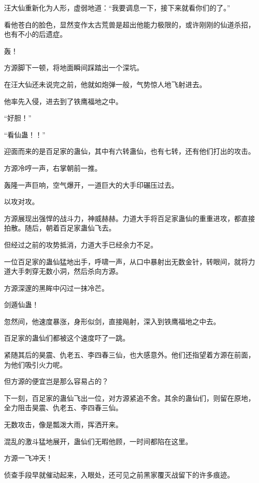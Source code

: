 \begin{this_body}
汪大仙重新化为人形，虚弱地道：“我要调息一下，接下来就看你们的了。”

看他苍白的脸色，显然变作太古荒兽是超出他能力极限的，或许刚刚的仙道杀招，也有不小的后遗症。

轰！

方源脚下一顿，将地面瞬间踩踏出一个深坑。

在汪大仙还未说完之前，他就如炮弹一般，气势惊人地飞射进去。

他率先入侵，进去到了铁鹰福地之中。

“好胆！”

“看仙蛊！！”

迎面而来的是百足家的蛊仙，其中有六转蛊仙，也有七转，还有他们打出的攻击。

方源冷哼一声，右掌朝前一推。

轰隆一声巨响，空气爆开，一道巨大的大手印碾压过去。

以攻对攻。

方源展现出强悍的战斗力，神威赫赫。力道大手将百足家蛊仙的重重进攻，都直接拍散。随后，朝着百足家蛊仙飞去。

但经过之前的攻势抵消，力道大手已经余力不足。

一位百足家的蛊仙猛地出手，呼啸一声，从口中暴射出无数金针，转眼间，就将力道大手刺穿无数小洞，然后杀向方源。

方源深邃的黑眸中闪过一抹冷芒。

剑遁仙蛊！

忽然间，他速度暴涨，身形似剑，直接飚射，深入到铁鹰福地之中去。

百足家的蛊仙们都被这个速度吓了一跳。

紧随其后的昊震、仇老五、李四春三仙，也大感意外。他们还指望着方源在前面，为他们吸引火力呢。

但方源的便宜岂是那么容易占的？

下一刻，百足家的蛊仙飞出一位，对方源紧追不舍。其余的蛊仙们，则留在原地，全力阻击昊震、仇老五、李四春三仙。

无数攻击，像是瓢泼大雨，挥洒开来。

混乱的激斗猛地展开，蛊仙们无暇他顾，一时间都陷在这里。

方源一飞冲天！

侦查手段早就催动起来，入眼处，还可见之前黑家覆灭战留下的许多痕迹。

\end{this_body}

